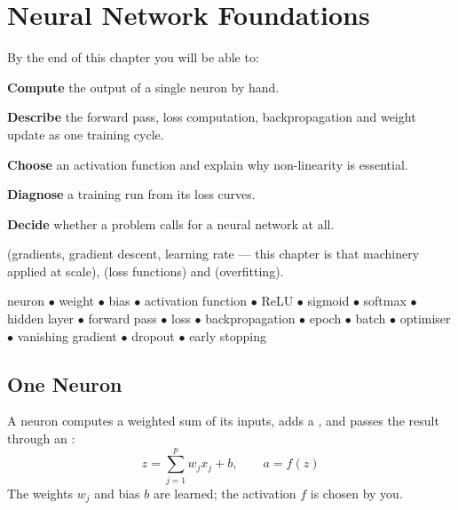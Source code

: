 \chapter{Neural Network Foundations}\label{ch:neuralnets}

\begin{outcomes}
By the end of this chapter you will be able to:
\begin{tight}
  \item \textbf{Compute} the output of a single neuron by hand.
  \item \textbf{Describe} the forward pass, loss computation, backpropagation and weight update as one training cycle.
  \item \textbf{Choose} an activation function and explain why non-linearity is essential.
  \item \textbf{Diagnose} a training run from its loss curves.
  \item \textbf{Decide} whether a problem calls for a neural network at all.
\end{tight}
\end{outcomes}

\begin{prereq}
 (gradients, gradient descent, learning rate --- this chapter is that
machinery applied at scale),  (loss functions) and
 (overfitting).
\end{prereq}

\begin{keyterms}
neuron $\bullet$ weight $\bullet$ bias $\bullet$ activation function $\bullet$
ReLU $\bullet$ sigmoid $\bullet$ softmax $\bullet$ hidden layer $\bullet$ forward
pass $\bullet$ loss $\bullet$ backpropagation $\bullet$ epoch $\bullet$ batch
$\bullet$ optimiser $\bullet$ vanishing gradient $\bullet$ dropout $\bullet$ early
stopping
\end{keyterms}

\section{One Neuron}

\begin{definitionbox}
A neuron computes a weighted sum of its inputs, adds a , and passes the
result through an :
\[
z = \sum_{j=1}^{p} w_j x_j + b, \qquad a = f(z)
\]
The weights $w_j$ and bias $b$ are learned; the activation $f$ is chosen by you.
\end{definitionbox}

